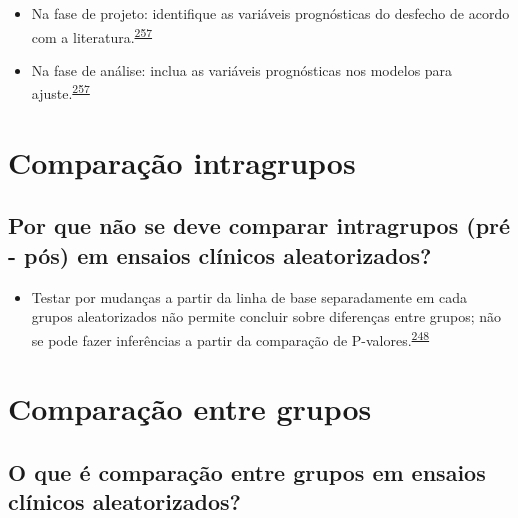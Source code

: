 \documentclass[
  a4paper,
]{book}
\providecommand{\tightlist}{%
  \setlength{\itemsep}{0pt}\setlength{\parskip}{0pt}}
\begin{document}
\begin{itemize}
\item
  Na fase de projeto: identifique as variáveis prognósticas do desfecho de acordo com a literatura.\textsuperscript{\protect\hyperlink{ref-roberts1999}{257}}
\item
  Na fase de análise: inclua as variáveis prognósticas nos modelos para ajuste.\textsuperscript{\protect\hyperlink{ref-roberts1999}{257}}
\end{itemize}

\hypertarget{comparacao-intragrupos}{%
\section{Comparação intragrupos}\label{comparacao-intragrupos}}

\hypertarget{por-que-nuxe3o-se-deve-comparar-intragrupos-pruxe9---puxf3s-em-ensaios-cluxednicos-aleatorizados}{%
\subsection{Por que não se deve comparar intragrupos (pré - pós) em ensaios clínicos aleatorizados?}\label{por-que-nuxe3o-se-deve-comparar-intragrupos-pruxe9---puxf3s-em-ensaios-cluxednicos-aleatorizados}}

\begin{itemize}
\tightlist
\item
  Testar por mudanças a partir da linha de base separadamente em cada grupos aleatorizados não permite concluir sobre diferenças entre grupos; não se pode fazer inferências a partir da comparação de P-valores.\textsuperscript{\protect\hyperlink{ref-bland2011}{248}}
\end{itemize}

\hypertarget{comparacao-entre-grupos}{%
\section{Comparação entre grupos}\label{comparacao-entre-grupos}}

\hypertarget{o-que-uxe9-comparauxe7uxe3o-entre-grupos-em-ensaios-cluxednicos-aleatorizados}{%
\subsection{O que é comparação entre grupos em ensaios clínicos aleatorizados?}\label{o-que-uxe9-comparauxe7uxe3o-entre-grupos-em-ensaios-cluxednicos-aleatorizados}}
\end{document}
